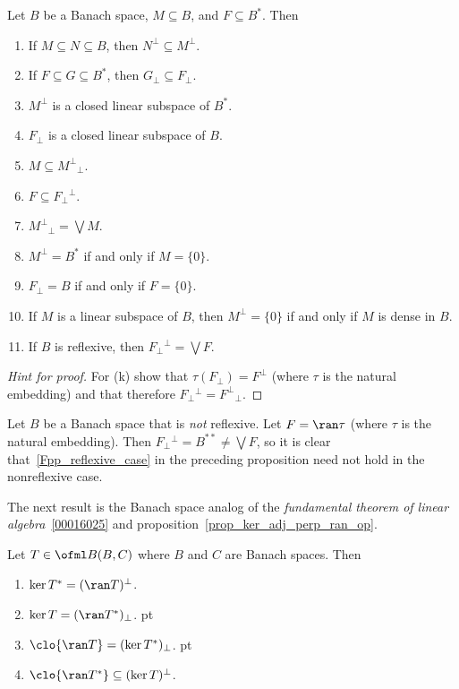 \begin{prop}[Annihilators]  Let $B$ be a Banach space, $M \subseteq B$, and $F \subseteq B^*$. Then
 \begin{enumerate}[label=\rm{(\alph*)}]
  \item If $M \subseteq N \subseteq B$, then $N^\perp \subseteq M^\perp$.
  \item If $F \subseteq G \subseteq B^*$, then $G_\perp \subseteq F_\perp$.
  \item $M^\perp$ is a closed linear subspace of $B^*$.
  \item $F_\perp$ is a closed linear subspace of $B$.
  \item $M \subseteq M^\perp{}_\perp$.
  \item $F \subseteq F_\perp{}^\perp$.
  \item $M^\perp{}_\perp = \bigvee M$.
  \item $M^\perp = B^*$ if and only if $M = \{0\}$.
  \item $F_\perp = B$ if and only if $F = \{0\}$.
  \item If $M$ is a linear subspace of $B$, then $M^\perp = \{0\}$ if and only if $M$ is
dense in $B$.
  \item\label{Fpp_reflexive_case} If $B$ is reflexive, then $F_\perp{}^\perp = \bigvee F$.
 \end{enumerate}
\end{prop}

\begin{proof}[\emph{Hint for proof}] For (k) show that $\tau(F_\perp) = F^\perp$ (where $\tau$ is the
natural embedding) and that therefore $F_\perp{}^\perp = F^\perp{}_\perp$.  \ns
\end{proof}

\begin{exam} Let $B$ be a Banach space that is \emph{not} reflexive.  Let $F = \ran \tau$ (where $\tau$ is the
natural embedding).  Then $F_\perp{}^\perp = B^{**} \ne \bigvee F$, so it is clear that~\ref{Fpp_reflexive_case}
in the preceding proposition need not hold in the nonreflexive case.
\end{exam}

The next result is the Banach space analog of the \emph{fundamental theorem of linear algebra}~\ref{00016025} and
proposition~\ref{prop_ker_adj_perp_ran_op}.

\begin{prop}\label{prop_FTLA_Bsp} Let $T \in \ofml B(B,C)$ where $B$ and $C$ are Banach spaces. Then
 \begin{enumerate}[label=\rm{(\alph*)}]
  \item $\ker T^\ast = (\ran T)^\perp$.
  \item $\ker T = (\ran T^*)_\perp$.
 pt
  \item $\clo{\ran T} = (\ker T^*)_\perp$.
 pt
  \item $\clo{\ran T^*} \subseteq (\ker T)^\perp$.
 \end{enumerate}
\end{prop}

